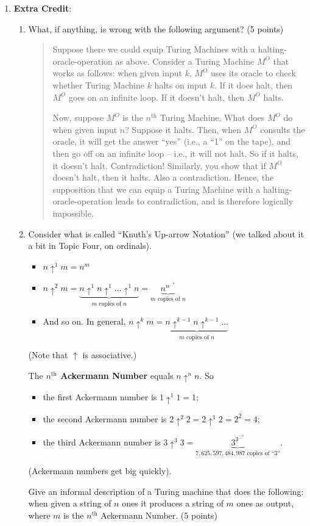 \documentclass[12pt,a4paper]{article}
\begin{document}
\begin{enumerate}
\item \textbf{Extra Credit}:
\begin{enumerate} 
\item What, if anything, is wrong with the following argument? (5 points)
\begin{quote}
Suppose there we could equip Turing Machines with a halting-oracle-operation as above. Consider a Turing Machine $M^O$ that works as follows: when given input $k$, $M^O$ uses its oracle to check whether Turing Machine $k$ halts on input $k$. If it does halt, then $M^O$ goes on an infinite loop. If it doesn't halt, then $M^O$ halts. 

Now, suppose $M^O$ is the $n^\text{th}$ Turing Machine. What does $M^O$ do when given input $n$? Suppose it halts. Then, when $M^O$ consults the oracle, it will get the answer ``yes'' (i.e., a ``1'' on the tape), and then go off on an infinite loop -- i.e., it will not halt. So if it halts, it doesn't halt. Contradiction! Similarly, you show that if $M^O$ doesn't halt, then it halts. Also a contradiction. Hence, the supposition that we can equip a Turing Machine with a halting-oracle-operation leads to contradiction, and is therefore logically impossible.
\end{quote}

\item Consider what is called ``Knuth's Up-arrow Notation'' (we talked about it a bit in Topic Four, on ordinals). 
\begin{itemize}
\item $n\uparrow^1 m = n^m$ 
\item $n\uparrow^2 m = \underbrace{ n \uparrow^1 n \uparrow^1 \ldots \uparrow^1 n}_{m\text{ copies of } n} = \underbrace{n^{n^{\ldots^n}}}_{m\text{ copies of }n}$
\item And so on. In general, $n\uparrow^k m = \underbrace{n\uparrow^{k-1} n \uparrow^{k-1} \ldots}_{m\text{ copies of }n}$
\end{itemize}
(Note that $\uparrow$ is associative.)
\vspace{3mm}

The \textbf{$n^\text{th}$ Ackermann Number} equals $n\uparrow^n n$. So
\begin{itemize} 
\item the first Ackermann number is $1\uparrow^1 1 = 1$;
\item the second Ackermann number is $2\uparrow^2 2 = 2\uparrow^1 2 = 2^2 = 4$;
\item the third Ackermann number is $3\uparrow^3 3 = \underbrace{3^{3^{\ldots^3}}}_{7,625,597,484,987\text{ copies of ``3''}}$.
\end{itemize}
(Ackermann numbers get big quickly).
\vspace{3mm}

Give an informal description of a Turing machine that does the following: when given a string of $n$ ones it produces a string of $m$ ones as output, where $m$ is
the $n^\text{th}$ Ackermann Number. (5 points)
\end{enumerate}

\end{enumerate}
\end{document}
